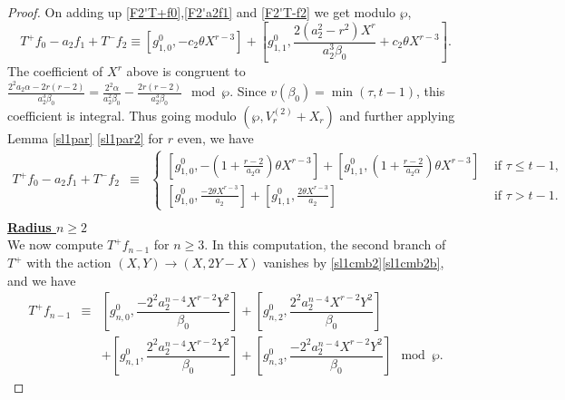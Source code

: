 \documentclass[11pt, reqno]{amsart}
\numberwithin{equation}{section}
\theoremstyle{definition}
\theoremstyle{remark}
\theoremstyle{definition}
\theoremstyle{remark}
\theoremstyle{remark}
\begin{document}
\begin{proof}
On adding up \eqref{F2'T+f0},\eqref{F2'a2f1} and \eqref{F2'T-f2} we get modulo $\wp$,
\begin{equation*}
  T^{+}f_{0}-a_{2}f_{1}+T^{-}f_{2}\equiv \left[g_{1,0}^{0}, -c_{2}\theta X^{r-3}\right] + \left[g_{1,1}^{0}, \dfrac{2(a_{2}^2-r^2)X^{r}}{a_{2}^3\beta_{0}}+ c_{2}\theta X^{r-3} \right].
    \end{equation*}
     The coefficient of $X^{r}$ above is congruent to $\frac{2^2a_{2}\alpha-2r(r-2)}{a_{2}^3\beta_{0}} = \frac{2^2\alpha}{a_{2}^2\beta_{0}}-\frac{2r(r-2)}{a_{2}^3\beta_{0}} \mod \wp$. Since $v(\beta_{0})= \min(\tau,t-1)$, this coefficient is integral. Thus going modulo $(\wp,V_{r}^{(2)}+X_{r})$ and further applying  Lemma \ref{sl1par} \eqref{sl1par2} for $r$  even, we have 
    \begin{eqnarray}\label{sl1F2'rad1}
   T^{+}f_{0}-a_{2}f_{1}+T^{-}f_{2}
    &\equiv &\begin{cases} 
    \left[g_{1,0}^{0}, -\left(1+\frac{r-2}{a_{2}\alpha} \right)\theta X^{r-3}\right] + \left[g_{1,1}^{0}, \left(1+\frac{r-2}{a_{2}\alpha}\right)\theta X^{r-3} \right] & \text{ if } \tau\leq t-1,\\
     \left[g_{1,0}^{0}, \frac{-2\theta X^{r-3}}{a_{2}}\right] + \left[g_{1,1}^{0}, \frac{2\theta X^{r-3}}{a_{2}}\right]  &\text{ if } \tau>t-1.
     \end{cases}\nonumber\\
     &&
     \end{eqnarray}
\noindent\underline{\textbf{Radius $n\geq 2$}}\\
We now compute $T^{+}f_{n-1}$ for $n\geq 3.$ In  this computation, the second branch of $T^{+}$ with the action $(X,Y)\to(X,2Y-X)$ vanishes  by \ref{sl1cmb2}\eqref{sl1cmb2b}, and we have
\begin{eqnarray}\label{F2'T+fn-1}
  T^{+}f_{n-1} &\equiv& \left[g_{n,0}^{0}, \dfrac{-2^2a_{2}^{n-4}X^{r-2}Y^2}{\beta_{0}}\right] +\left[g_{n,2}^{0}, \dfrac{2^2a_{2}^{n-4}X^{r-2}Y^2}{\beta_{0}}\right]\nonumber\\
  &&+\left[g_{n,1}^{0}, \dfrac{2^2a_{2}^{n-4}X^{r-2}Y^2}{\beta_{0}}\right] +\left[g_{n,3}^{0}, \dfrac{-2^2a_{2}^{n-4}X^{r-2}Y^2}{\beta_{0}}\right] \mod\wp.
\end{eqnarray}
%


\end{proof}
\end{document}
